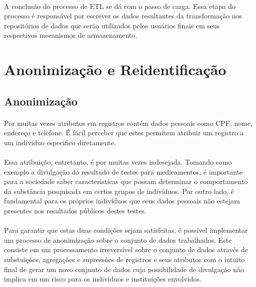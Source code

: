 \paragraph{} A conclusão do processo de ETL se dá com o passo de carga. Essa etapa do processo é responsável por escrever os dados resultantes da transformação nos repositórios de dados que serão utilizados pelos usuários finais em seus respectivos mecanismos de armazenamento.

\section{Anonimização e Reidentificação}

\subsection{Anonimização}

\paragraph{} Por muitas vezes atributos em registros contém dados pessoais como CPF, nome, endereço e telefone. É fácil perceber que estes permitem atribuir um registro a um individuo especifico diretamente.

\paragraph{} Essa atribuição, entretanto, é por muitas vezes indesejada. Tomando como exemplo a divulgação do resultado de testes para medicamentos, é importante para a sociedade saber caracteristicas que possam determinar o comportamento da 
substância pesquisada em certos grupos de indivíduos. Por outro lado, é fundamental para os próprios indivíduos que seus dados pessoais não estejam presentes nos resultados públicos destes testes. 

\paragraph{} Para garantir que estas duas condições sejam satisfeitas, é possível implementar um processo de anonimização sobre o conjunto de dados trabalhados. Este consiste em um processamento irreversível\cite{dias2016multilingual} sobre o conjunto de dados através de substuições, agregações e supressões de registros e seus atributos com o intuito final de gerar um novo conjunto de dados cuja possibilidade de divulgação não implica em um risco para os individuos e instituições envolvidos. 


